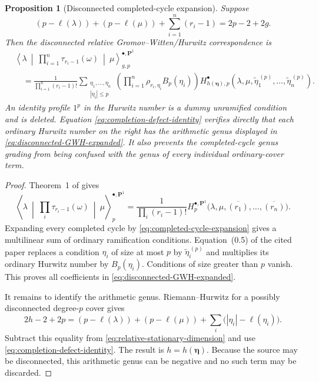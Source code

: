 \documentclass[10pt,a4paper]{amsart}
\newtheorem{proposition}[theorem]{Proposition}
\numberwithin{equation}{section}
\begin{document}
\begin{proposition}[Disconnected completed-cycle expansion]
\label{prop:disconnected-completed-cycle-expansion}
Suppose
\begin{equation}\label{eq:relative-stationary-dimension}
 (p-\ell(\lambda))+(p-\ell(\mu))
 +\sum_{i=1}^n(r_i-1)=2p-2+2g.
\end{equation}
Then the disconnected relative Gromov--Witten/Hurwitz correspondence is
\begin{align}
&\left\langle\lambda\ \middle|\
   \prod_{i=1}^n\tau_{r_i-1}(\omega)\
   \middle|\ \mu\right\rangle^{\bullet,\mathbf P^1}_{g,p}
\label{eq:disconnected-GWH-expanded}\\
&\quad=
 \frac1{\prod_{i=1}^n(r_i-1)!}
 \sum_{\substack{\eta_1,\ldots,\eta_n\\|\eta_i|\leq p}}
 \left(\prod_{i=1}^n\rho_{r_i,\eta_i}B_p(\eta_i)\right)
 H^\bullet_{h(\boldsymbol\eta),p}
 \left(\lambda,\mu,
       \widetilde\eta_1^{\,(p)},\ldots,
       \widetilde\eta_n^{\,(p)}\right).
\nonumber
\end{align}
An identity profile $1^p$ in the Hurwitz number is a dummy unramified
condition and is deleted.  Equation
\eqref{eq:completion-defect-identity} verifies directly that each ordinary
Hurwitz number on the right has the arithmetic genus displayed in
\eqref{eq:disconnected-GWH-expanded}.  It also prevents the
completed-cycle genus grading from being confused with the genus of every
individual ordinary-cover term.
\end{proposition}

\begin{proof}
Theorem~1 of \cite{OkounkovPandharipande} gives
\[
 \left\langle\lambda\ \middle|\
   \prod_i\tau_{r_i-1}(\omega)\
   \middle|\ \mu\right\rangle^{\bullet,\mathbf P^1}_{p}
 =\frac1{\prod_i(r_i-1)!}
 H^{\bullet,\mathbf P^1}_{p}
 \bigl(\lambda,\mu,
       \overline{(r_1)},\ldots,\overline{(r_n)}\bigr).
\]
Expanding every completed cycle by
\eqref{eq:completed-cycle-expansion} gives a multilinear sum of ordinary
ramification conditions.  Equation~(0.5) of the cited paper replaces a
condition $\eta_i$ of size at most $p$ by
$\widetilde\eta_i^{\,(p)}$ and multiplies its ordinary Hurwitz number by
$B_p(\eta_i)$.  Conditions of size greater than $p$ vanish.  This proves
all coefficients in \eqref{eq:disconnected-GWH-expanded}.

It remains to identify the arithmetic genus.  Riemann--Hurwitz for a
possibly disconnected degree-$p$ cover gives
\[
 2h-2+2p
 =(p-\ell(\lambda))+(p-\ell(\mu))
  +\sum_i\bigl(|\eta_i|-\ell(\eta_i)\bigr).
\]
Subtract this equality from
\eqref{eq:relative-stationary-dimension} and use
\eqref{eq:completion-defect-identity}.  The result is
$h=h(\boldsymbol\eta)$.  Because the source may be disconnected, this
arithmetic genus can be negative and no such term may be discarded.
\end{proof}
\end{document}
